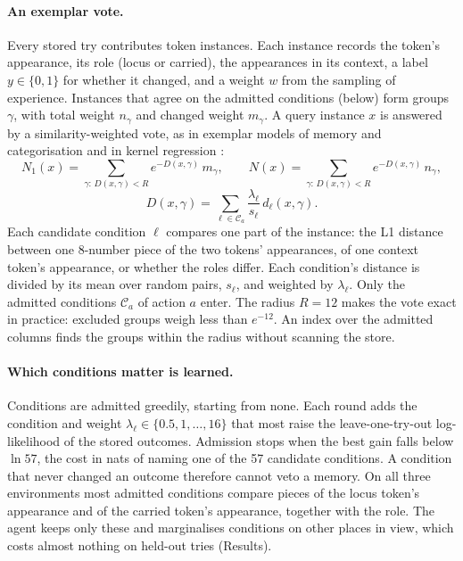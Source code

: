 \documentclass{article}
\begin{document}
\paragraph{An exemplar vote.} Every stored try contributes token instances. Each instance records the token's appearance, its role (locus or carried), the appearances in its context, a label $y\in\{0,1\}$ for whether it changed, and a weight $w$ from the sampling of experience. Instances that agree on the admitted conditions (below) form groups $\gamma$, with total weight $n_\gamma$ and changed weight $m_\gamma$. A query instance $x$ is answered by a similarity-weighted vote, as in exemplar models of memory and categorisation \cite{Medin1978,Nosofsky1986,Hintzman1986} and in kernel regression \cite{Nadaraya1964,Watson1964}:
\begin{equation} \label{eq:vote}
    N_1(x) = \sum_{\gamma:\,D(x,\gamma)<R} e^{-D(x,\gamma)}\,m_\gamma, \qquad N(x) = \sum_{\gamma:\,D(x,\gamma)<R} e^{-D(x,\gamma)}\,n_\gamma ,
\end{equation}
\begin{equation} \label{eq:metric}
    D(x,\gamma) = \sum_{\ell\in\mathcal{C}_a}\frac{\lambda_\ell}{s_\ell}\,d_\ell(x,\gamma).
\end{equation}
Each candidate condition $\ell$ compares one part of the instance: the L1 distance between one 8-number piece of the two tokens' appearances, of one context token's appearance, or whether the roles differ. Each condition's distance is divided by its mean over random pairs, $s_\ell$, and weighted by $\lambda_\ell$. Only the admitted conditions $\mathcal{C}_a$ of action $a$ enter. The radius $R=12$ makes the vote exact in practice: excluded groups weigh less than $e^{-12}$. An index over the admitted columns finds the groups within the radius without scanning the store.

\paragraph{Which conditions matter is learned.} Conditions are admitted greedily, starting from none. Each round adds the condition and weight $\lambda_\ell\in\{0.5,1,\dots,16\}$ that most raise the leave-one-try-out log-likelihood of the stored outcomes. Admission stops when the best gain falls below $\ln 57$, the cost in nats of naming one of the 57 candidate conditions. A condition that never changed an outcome therefore cannot veto a memory. On all three environments most admitted conditions compare pieces of the locus token's appearance and of the carried token's appearance, together with the role. The agent keeps only these and marginalises conditions on other places in view, which costs almost nothing on held-out tries (Results).
\end{document}
